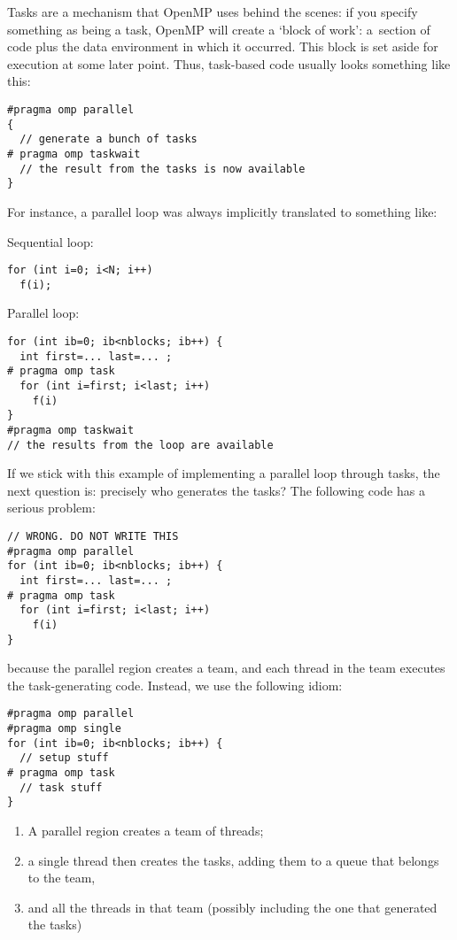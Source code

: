 
\label{sec:omp:task}

Tasks are a mechanism that OpenMP uses behind the scenes:
if you specify something as being a task, OpenMP will create
a `block of work': a~section of code plus the data environment
in which it occurred. This block is set aside for execution at some later point.
Thus, task-based code usually looks something like this:
\begin{lstlisting}
#pragma omp parallel
{
  // generate a bunch of tasks
# pragma omp taskwait
  // the result from the tasks is now available  
}
\end{lstlisting}
For instance, a parallel loop was always implicitly translated to something like:
\begin{multicols}{2}
Sequential loop:
\begin{lstlisting}
for (int i=0; i<N; i++)
  f(i);
\end{lstlisting}
\columnbreak
Parallel loop:
\begin{lstlisting}
for (int ib=0; ib<nblocks; ib++) {
  int first=... last=... ;
# pragma omp task
  for (int i=first; i<last; i++)
    f(i)
}
#pragma omp taskwait
// the results from the loop are available
\end{lstlisting}
\end{multicols}

If we stick with this example of implementing a parallel loop
through tasks, the next question is: precisely who generates the tasks?
The following code has a serious problem:
\begin{lstlisting}
// WRONG. DO NOT WRITE THIS
#pragma omp parallel
for (int ib=0; ib<nblocks; ib++) {
  int first=... last=... ;
# pragma omp task
  for (int i=first; i<last; i++)
    f(i)
}
\end{lstlisting}
because the parallel region creates a team, and each thread in the team
executes the task-generating code.
Instead, we use the following idiom:
\begin{lstlisting}
#pragma omp parallel
#pragma omp single
for (int ib=0; ib<nblocks; ib++) {
  // setup stuff
# pragma omp task
  // task stuff
}
\end{lstlisting}
\begin{enumerate}
\item A parallel region creates a team of threads;
\item a single thread then creates the tasks, adding them to a queue
  that belongs to the team,
\item and all the threads in that team (possibly including the one
  that generated the tasks) 
\end{enumerate}

